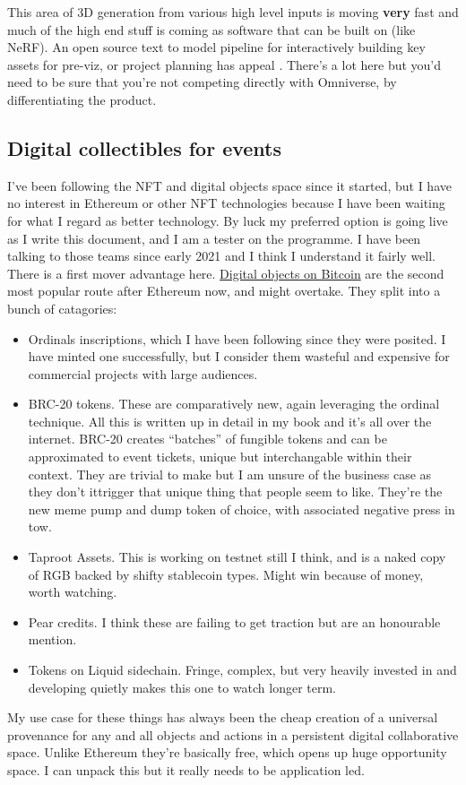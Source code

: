 This area of 3D generation from various high level inputs is moving \textbf{very} fast and much of the high end stuff is coming as software that can be built on (like NeRF). An open source text to model pipeline for interactively building key assets for pre-viz, or project planning has appeal  \cite{poole2022dreamfusion}.
There's a lot here but you'd need to be sure that you're not competing directly with Omniverse, by differentiating the product.

\subsection{Digital collectibles for events}
I've been following the NFT and digital objects space since it started, but I have no interest in Ethereum or other NFT technologies because I have been waiting for what I regard as better technology. By luck my preferred option is going live as I write this document, and I am a tester on the programme. I have been talking to those teams since early 2021 and I think I understand it fairly well. There is a first mover advantage here. \href{https://coinmarketcap.com/alexandria/article/bitcoin-is-now-the-second-most-popular-blockchain-for-nfts}{Digital objects on Bitcoin} are the second most popular route after Ethereum now, and might overtake. They split into a bunch of catagories:
\begin{itemize}
\item Ordinals inscriptions, which I have been following since they were posited. I have minted one successfully, but I consider them wasteful and expensive for commercial projects with large audiences.
\item BRC-20 tokens. These are comparatively new, again leveraging the ordinal technique. All this is written up in detail in my book and it's all over the internet. BRC-20 creates ``batches'' of fungible tokens and can be approximated to event tickets, unique but interchangable within their context. They are trivial to make but I am unsure of the business case as they don't it{trigger} that unique thing that people seem to like. They're the new meme pump and dump token of choice, with associated negative press in tow.
\item Taproot Assets. This is working on testnet still I think, and is a naked copy of RGB backed by shifty stablecoin types. Might win because of money, worth watching.
\item Pear credits. I think these are failing to get traction but are an honourable mention.
\item Tokens on Liquid sidechain. Fringe, complex, but very heavily invested in and developing quietly makes this one to watch longer term.
\end{itemize}
My use case for these things has always been the cheap creation of a universal provenance for any and all objects and actions in a persistent digital collaborative space. Unlike Ethereum they're basically free, which opens up huge opportunity space. I can unpack this but it really needs to be application led.
